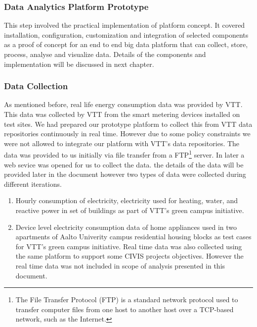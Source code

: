 \subsubsection{Data Analytics Platform Prototype}
This step involved the practical implementation of platform concept. It covered installation, configuration, customization and integration of selected components as a proof of concept for an end to end big data platform that can collect, store, process, analyse and visualize data. Details of the components and implementation will be discussed in next chapter.
\subsubsection{Data Collection}
As mentioned before, real life energy consumption data was provided by VTT. This data was collected by VTT from the smart metering devices installed on test sites. We had prepared our prototype platform to collect this from VTT data repositories continuously in real time. However due to some policy constraints we were not allowed to integrate our platform with VTT's data repositories. The data was provided to us initially via file transfer from a FTP\footnote{The File Transfer Protocol (FTP) is a standard network protocol used to transfer computer files from one host to another host over a TCP-based network, such as the Internet.} server. In later a web sevice was opened for us to collect the data. the details of the data will be provided later in the document however two types of data were collected during different iterations.
\begin{enumerate}
\item Hourly consumption of electricity, electricity used for heating, water, and reactive power in set of buildings as part of VTT's green campus initiative.
\item Device level electricity consumption data of home appliances used in two apartments of Aalto Univerity campus residential housing blocks as test cases for VTT's green campus initiative.
Real time data was also collected using the same platform to support some CIVIS projects objectives. However the real time data was not included in scope of analysis presented in this document.  
\end{enumerate}

